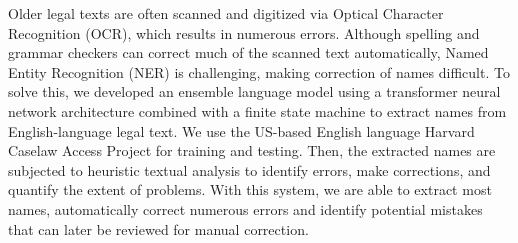 Older legal texts are often scanned and digitized via Optical Character Recognition (OCR), which results in numerous errors. Although spelling and grammar checkers can correct much of the scanned text automatically, Named Entity Recognition (NER) is challenging, making correction of names difficult. To solve this, we developed an ensemble language model using a transformer neural network architecture combined with a finite state machine to extract names from English-language legal text. We use the US-based English language Harvard Caselaw Access Project for training and testing. Then, the extracted names are subjected to heuristic textual analysis to identify errors, make corrections, and quantify the extent of problems. With this system, we are able to extract most names, automatically correct numerous errors and identify potential mistakes that can later be reviewed for manual correction.
